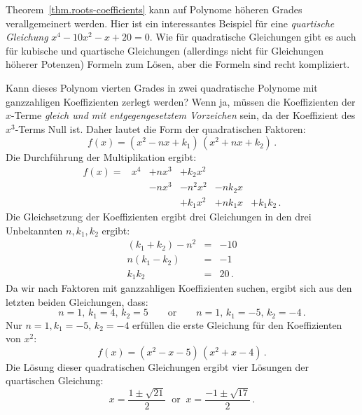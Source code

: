 \begin{example}
Theorem~\ref{thm.roots-coefficients} kann auf Polynome höheren Grades verallgemeinert werden. Hier ist ein interessantes Beispiel für eine \emph{quartische Gleichung} $x^4-10x^2-x+20=0$. Wie für quadratische Gleichungen gibt es auch für kubische und quartische Gleichungen (allerdings nicht für Gleichungen höherer Potenzen) Formeln zum Lösen, aber die Formeln sind recht kompliziert.

Kann dieses Polynom vierten Grades in zwei quadratische Polynome mit ganzzahligen Koeffizienten zerlegt werden? Wenn ja, müssen die Koeffizienten der $x$-Terme \emph{gleich und mit entgegengesetztem Vorzeichen} sein, da der Koeffizient des $x^3$-Terms Null ist. Daher lautet die Form der quadratischen Faktoren:
\[
f(x) = (x^2 - nx + k_1)\, (x^2 + nx + k_2)\,.
\]
Die Durchführung der Multiplikation ergibt:
\[
\renewcommand{\arraystretch}{1.1}
\begin{array}{rrrrrr}
f(x) = &x^4 & + nx^3 & + k_2 x^2\\
&& -nx^3 &- n^2x^2 &-nk_2x\\
&&&+k_1x^2 &+ nk_1x &+ k_1k_2\,.
\end{array}
\]
Die Gleichsetzung der Koeffizienten ergibt drei Gleichungen in den drei Unbekannten $n,k_1,k_2$ ergibt:
\begin{eqnarray*}
(k_1+k_2)-n^2 &=& -10\\
n(k_1-k_2) &=& -1\\
k_1k_2 &=& 20\,.
\end{eqnarray*}
Da wir nach Faktoren mit ganzzahligen Koeffizienten suchen, ergibt sich aus den letzten beiden Gleichungen, dass:
\[
n=1,\,k_1=4,\,k_2=5  \quad\quad\textrm{or} \quad\quad n=1,\,k_1=-5,\, k_2=-4\,.
\]
Nur $n=1,k_1=-5,\, k_2=-4$ erfüllen die erste Gleichung für den Koeffizienten von $x^2$:
\[
f(x) = (x^2 - x - 5)\, (x^2 + x - 4)\,.
\]
Die Lösung dieser quadratischen Gleichungen ergibt vier Lösungen der quartischen Gleichung:
\[
x = \frac{1\pm\sqrt{21}}{2}  \;\;\textrm{or} \;\; x= \frac{-1\pm\sqrt{17}}{2} \,.
\]
\end{example}

